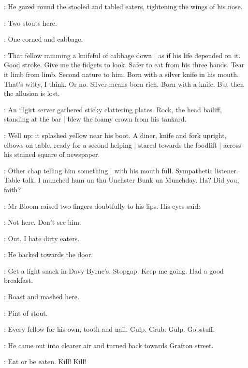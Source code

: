 :
He gazed round the stooled and tabled eaters,
tightening the wings of his nose.

:
Two stouts here.

:
One corned and cabbage.

\BloomInt:
That fellow ramming a knifeful of cabbage down |
as if his life depended on it.
Good stroke.
Give me the fidgets to look.
Safer to eat from his three hands.
Tear it limb from limb.
Second nature to him.
Born with a silver knife in his mouth.
That's witty, I think.
Or no.
Silver means born rich.
Born with a knife.
But then the allusion is lost.

:
An illgirt server gathered sticky clattering plates.
Rock, the head bailiff,
standing at the bar |
blew the foamy crown from his tankard.

:
Well up:
it splashed yellow near his boot.
A diner, knife and fork upright,
elbows on table,
ready for a second helping |
stared towards the foodlift |
across his stained square of newspaper.

\BloomInt:
Other chap telling him something |
with his mouth full.
Sympathetic listener.
Table talk.
I munched hum un thu Unchster Bunk un Munchday.
Ha?
Did you, faith?

:
Mr Bloom raised two fingers doubtfully to his lips.
His eyes said:

\Bloom:
Not here.
Don't see him.

\BloomInt:
Out.
I hate dirty eaters.

:
He backed towards the door.

\BloomInt:
Get a light snack in Davy Byrne's.
Stopgap.
Keep me going.
Had a good breakfast.

:
Roast and mashed here.

:
Pint of stout.

\BloomInt:
Every fellow for his own, tooth and nail.
Gulp.
Grub.
Gulp.
Gobstuff.

:
He came out into clearer air and turned back towards Grafton street.

\BloomInt:
Eat or be eaten.
Kill!
Kill!

